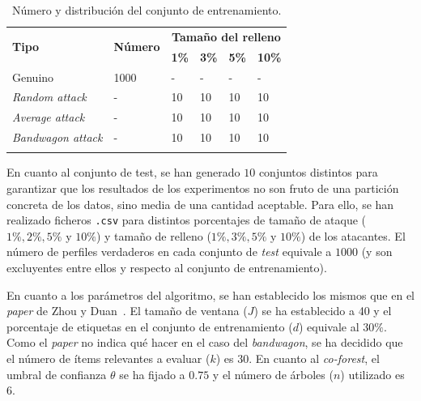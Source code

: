 \begin{table}
	\begin{centering}
		\begin{tabular}{@{} p{9em} p{7em} p{3em} p{3em} p{3em} p{3em} @{}}
			\toprule
			\multirow{2}{*}{\hfil \textbf{Tipo}} & \multirow{2}{*}{\hfil \textbf{Número}} & \multicolumn{4}{c}{\hfil \textbf{Tamaño del relleno}} \\ \cmidrule{3-6}
			&\hfil   &\hfil \textbf{1\%} &\hfil \textbf{3\%} & \hfil \textbf{5\%} & \hfil \textbf{10\%}\\ 
			\toprule
			Genuino &1000&\hfil -	& \hfil -  & \hfil - & \hfil -\\
			\textit{Random attack} &-	&\hfil 10 & \hfil 10	&  \hfil 10 & \hfil 10\\
			\textit{Average attack} &-	& \hfil 10 & \hfil 10 & \hfil 10 & \hfil 10 \\
			\textit{Bandwagon attack} &- & \hfil 10 & \hfil 10 & \hfil 10 & \hfil10 \\
			\\ \bottomrule
		\end{tabular}
	\end{centering}
	\caption[Sistemas de recomendación: descripción de los conjuntos]{Número y distribución del conjunto de entrenamiento.}
	\label{tbl:entrenamiento_ML10M}	
\end{table}

En cuanto al conjunto de test, se han generado $10$ conjuntos distintos para garantizar que los resultados de los experimentos no son fruto de una partición concreta de los datos, sino media de una cantidad aceptable. Para ello, se han realizado ficheros \texttt{.csv} para distintos porcentajes de tamaño de ataque ($1\%, 2\%, 5\%$ y $10\%$) y tamaño de relleno ($1\%, 3\%, 5\%$ y $10\%$) de los atacantes. El número de perfiles verdaderos en cada conjunto de \textit{test} equivale a $1000$ (y son excluyentes entre ellos y respecto al conjunto de entrenamiento).

En cuanto a los parámetros del algoritmo, se han establecido los mismos que en el \textit{paper} de Zhou y Duan~\cite{zhou2021SemisupervisedRecommendationAttack}. El tamaño de ventana ($J$) se ha establecido a 40 y el porcentaje de etiquetas en el conjunto de entrenamiento ($d$) equivale al $30\%$. Como el \textit{paper} no indica qué hacer en el caso del \textit{bandwagon}, se ha decidido que el número de ítems relevantes a evaluar ($k$) es 30. En cuanto al \textit{co-forest}, el umbral de confianza $\theta$ se ha fijado a $0$.$75$ y el número de árboles ($n$) utilizado es 6.


